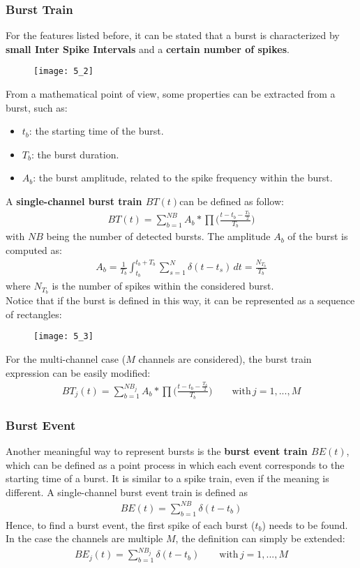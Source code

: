 \subsubsection{Burst Train}
For the features listed before, it can be stated that a burst is characterized by
\textbf{small Inter Spike Intervals} and a \textbf{certain number of spikes}.
\begin{figure}[H]
    \texttt{[image: 5\_2]}
    \centering
\end{figure}
From a mathematical point of view, some properties can be extracted from a burst, such as:
\begin{itemize}
    \item \(t_b\): the starting time of the burst.
    \item \(T_b\): the burst duration.
    \item \(A_b\): the burst amplitude, related to the spike frequency within the burst.
\end{itemize}
A \textbf{single-channel burst train \(BT(t)\)}can be defined as follow:
\begin{align*}
    BT(t) = \sum_{b=1}^{NB}A_b*\prod\biggl(\frac{t-t_b-\frac{T_b}{2}}{T_b}\biggr)
\end{align*}
with \(NB\) being the number of detected bursts.
The amplitude \(A_b\) of the burst is computed as:
\begin{align*}
    A_b=\frac{1}{T_b}\int_{t_b}^{t_b+T_b}\sum_{s=1}^{N}\delta{(t-t_s)}\,dt=\frac{N_{T_b}}{T_b}
\end{align*}
where \(N_{T_b}\) is the number of spikes within the considered burst.\\
Notice that if the burst is defined in this way, it can be represented as a sequence of
rectangles:
\begin{figure}[H]
    \texttt{[image: 5\_3]}
    \centering
\end{figure}
For the multi-channel case (\(M\) channels are considered), the burst train
expression can be easily modified:
\begin{align*}
    BT_{j}(t) = \sum_{b=1}^{NB_{j}}A_b*\prod\biggl(\frac{t-t_b-\frac{T_b}{2}}{T_b}\biggr)
    \quad\quad\text{with}\,j=1,...,M
\end{align*}
\subsubsection{Burst Event}
Another meaningful way to represent bursts is the \textbf{burst event train \(BE(t)\)},
which can be defined as a point process in which each event corresponds to the starting time
of a burst. It is similar to a spike train, even if the meaning is different.
A single-channel burst event train is defined as
\begin{align*}
    BE(t)=\sum_{b=1}^{NB}\delta(t-t_b)
\end{align*}
Hence, to find a burst event, the first spike of each burst (\(t_b\)) needs to be found.\\
In the case the channels are multiple \(M\), the definition can simply be extended:
\begin{align*}
    BE_{j}(t)=\sum_{b=1}^{NB_{j}}\delta(t-t_b)
    \quad\quad\text{with}\,j=1,...,M
\end{align*}

